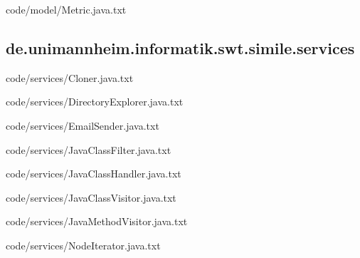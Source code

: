 
{code/model/Metric.java.txt}
\subsection{de.unimannheim.informatik.swt.simile.services}

{code/services/Cloner.java.txt}


{code/services/DirectoryExplorer.java.txt}


{code/services/EmailSender.java.txt}


{code/services/JavaClassFilter.java.txt}


{code/services/JavaClassHandler.java.txt}


{code/services/JavaClassVisitor.java.txt}


{code/services/JavaMethodVisitor.java.txt}


{code/services/NodeIterator.java.txt}

